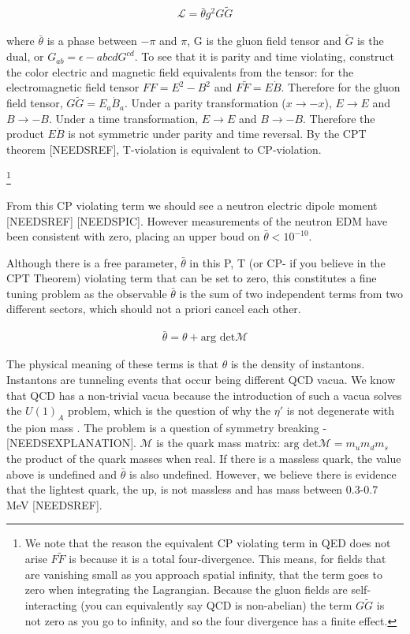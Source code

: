 \documentclass[12pt,twosides]{book}
\begin{document}
\begin{align*}
\mathcal{L} = \bar \theta g^2 G \tilde G
\end{align*}

where $\bar \theta$ is a phase between $-\pi$ and $\pi$, G is the gluon field tensor and $\tilde G$ is the dual, or $G_{ab} = \epsilon-{abcd} G^{cd}$. To see that it is parity and time violating, construct the color electric and magnetic field equivalents from the tensor: for the electromagnetic field tensor $FF = E^2 -B^2$ and $F\tilde F = E\dot B$. Therefore for the gluon field tensor, $G\tilde G = E_a \dot B_a$. Under a parity transformation ($x \rightarrow -x$), $E \rightarrow E$ and $B \rightarrow -B$. Under a time transformation, $
E \rightarrow E$ and $B \rightarrow -B$.  Therefore the product $E\dot B$ is not symmetric under parity and time reversal. By the CPT theorem [NEEDSREF], T-violation is equivalent to CP-violation.

\footnote{We note that the reason the equivalent CP violating term in QED does not arise $F\tilde F$ is because it is a total four-divergence. This means, for fields that are vanishing small as you approach spatial infinity, that the term goes to zero when integrating the Lagrangian. Because the gluon fields are self-interacting (you can equivalently say QCD is non-abelian) the term $G \tilde G$ is not zero as you go to infinity, and so the four divergence has a finite effect.}

 From this CP violating term we should see a neutron electric dipole moment [NEEDSREF] [NEEDSPIC]. However measurements of the neutron EDM have been consistent with zero, placing an upper boud on $\bar \theta < 10^{-10}$.

Although there is a free parameter, $\bar \theta$ in this P, T (or CP- if you believe in the CPT Theorem) violating term that can be set to zero, this constitutes a fine tuning problem as the observable $\bar \theta$ is the sum of two independent terms from two different sectors, which should not a priori cancel each other.

\begin{align*}
\bar \theta = \theta + \text{arg det} \mathcal{M}
\end{align*}

The physical meaning of these terms is that $\theta$ is the density of instantons. Instantons are tunneling events that occur being different QCD vacua. We know that QCD has a non-trivial vacua because the introduction of such a vacua solves the $U(1)_A$ problem, which is the question of why the $\eta'$ is not degenerate with the pion mass \cite{thooft76}. The problem is a question of symmetry breaking - [NEEDSEXPLANATION]. $\mathcal{M}$ is the quark mass matrix: $\text{arg det} \mathcal{M} = m_um_dm_s$ the product of the quark masses when real. If there is a massless quark, the value above is undefined and $\bar \theta$ is also undefined. However, we believe there is evidence that the lightest quark, the up, is not massless and has mass between 0.3-0.7 MeV [NEEDSREF].
\end{document}
